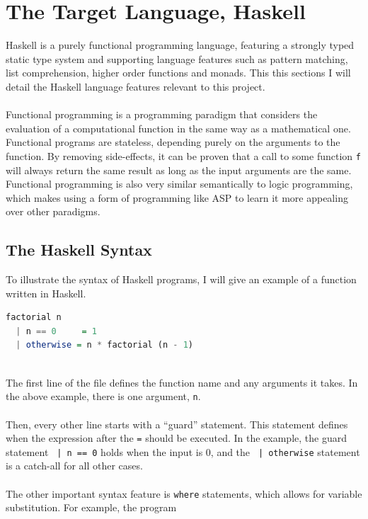 \section{The Target Language, Haskell}
Haskell \cite{Hudak2007} is a purely functional programming language, featuring a strongly typed static type system and supporting language features such as pattern matching, list comprehension, higher order functions and monads. This this sections I will detail the Haskell language features relevant to this project. \\ \\
Functional programming is a programming paradigm that considers the evaluation of a computational function in the same way as a mathematical one. Functional programs are stateless, depending purely on the arguments to the function. By removing side-effects, it can be proven that a call to some function \lstinline!f! will always return the same result as long as the input arguments are the same. Functional programming is also very similar semantically to logic programming, which makes using a form of programming like ASP to learn it more appealing over other paradigms.

\subsection{The Haskell Syntax}
To illustrate the syntax of Haskell programs, I will give an example of a function written in Haskell.

\begin{lstlisting}[language = Haskell]
factorial n
  | n == 0     = 1
  | otherwise = n * factorial (n - 1)
\end{lstlisting}
\mbox{} \\
The first line of the file defines the function name and any arguments it takes. In the above example, there is one argument, \lstinline!n!. \\ \\
Then, every other line starts with a ``guard'' statement. This statement defines when the expression after the \lstinline!=! should be executed. In the example, the guard statement \lstinline! | n == 0! holds when the input is 0, and the \lstinline! | otherwise! statement is a catch-all for all other cases. \\ \\
The other important syntax feature is \lstinline!where! statements, which allows for variable substitution. For example, the program \\

